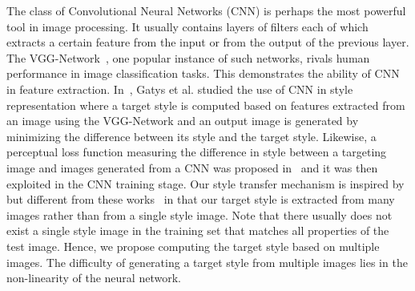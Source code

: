 \documentclass[10pt,twocolumn,letterpaper]{article}
\begin{document}
The class of Convolutional Neural Networks (CNN) is perhaps the most powerful tool in image processing. It usually contains layers of filters each of which extracts a certain feature from the input or from the output of the previous layer. The VGG-Network~\cite{simonyan2014very}, one popular instance of such networks, rivals human performance in image classification tasks. This demonstrates the ability of CNN in feature extraction. In~\cite{gatys2015texture,gatys2015neural}, Gatys et al. studied the use of CNN in style representation where a target style is computed based on features extracted from an image using the VGG-Network and an output image is generated by minimizing the difference between its style and the target style. Likewise, a perceptual loss function measuring the difference in style between a targeting image and images generated from a CNN was proposed in~\cite{feifei2016} and it was then exploited in the CNN training stage. Our style transfer mechanism is inspired by but different from these works~\cite{gatys2015texture,gatys2015neural,feifei2016} in that our target style is extracted from many images rather than from a single style image. Note that there usually does not exist a single style image in the training set that matches all properties of the test image. Hence, we propose computing the target style based on multiple images. The difficulty of generating a target style from multiple images lies in the non-linearity of the neural network.
\end{document}

